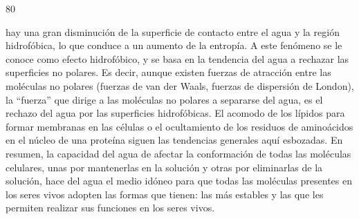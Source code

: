 80

hay una gran disminución de la superficie de contacto entre el agua y la región
hidrofóbica, lo que conduce a un aumento de la entropía. A este fenómeno se le conoce
como efecto hidrofóbico, y se basa en la tendencia del agua a rechazar las superficies no
polares. Es decir, aunque existen fuerzas de atracción entre las moléculas no polares
(fuerzas de van der Waals, fuerzas de dispersión de London), la “fuerza” que dirige a las
moléculas no polares a separarse del agua, es el rechazo del agua por las superficies
hidrofóbicas. El acomodo de los lípidos para formar membranas en las células o el
ocultamiento de los residuos de aminoácidos en el núcleo de una proteína siguen las
tendencias generales aquí esbozadas.
En resumen, la capacidad del agua de afectar la conformación de todas las moléculas
celulares, unas por mantenerlas en la solución y otras por eliminarlas de la solución, hace
del agua el medio idóneo para que todas las moléculas presentes en los seres vivos
adopten las formas que tienen: las más estables y las que les permiten realizar sus
funciones en los seres vivos.